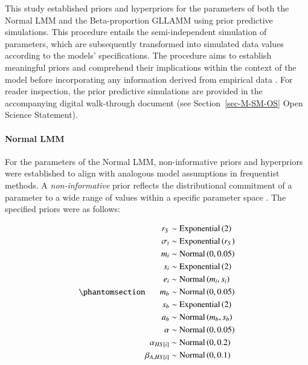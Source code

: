 \documentclass[
  authoryear,
  preprint,
  1p]{elsarticle}
\let\oldparagraph\paragraph
\renewcommand{\paragraph}[1]{\oldparagraph{#1}\mbox{}}
\begin{document}
This study established priors and hyperpriors for the parameters of both
the Normal LMM and the Beta-proportion GLLAMM using prior predictive
simulations. This procedure entails the semi-independent simulation of
parameters, which are subsequently transformed into simulated data
values according to the models' specifications. The procedure aims to
establish meaningful priors and comprehend their implications within the
context of the model before incorporating any information derived from
empirical data \citep{McElreath_2020}. For reader inspection, the prior
predictive simulations are provided in the accompanying digital
walk-through document (see Section~\ref{sec-M-SM-OS} Open Science
Statement).

\paragraph{Normal LMM}\label{sec-M-SM-P-NLMM}

For the parameters of the Normal LMM, non-informative priors and
hyperpriors were established to align with analogous model assumptions
in frequentist methods. A \emph{non-informative} prior reflects the
distributional commitment of a parameter to a wide range of values
within a specific parameter space \citep{Everitt_et_al_2010}. The
specified priors were as follows:

\begin{equation}\phantomsection\label{eq-normal-LMM-priors}{
\begin{aligned}
r_{S} &\sim \text{Exponential}\left( 2 \right) \\ 
\sigma_{i} &\sim \text{Exponential}\left( r_{S} \right) \\
m_{i} &\sim \text{Normal} \left( 0, 0.05 \right) \\
s_{i} &\sim \text{Exponential} \left( 2 \right) \\
e_{i} &\sim \text{Normal} \left( m_{i}, s_{i} \right) \\
m_{b} &\sim \text{Normal} \left( 0, 0.05 \right) \\
s_{b} &\sim \text{Exponential} \left( 2 \right) \\
a_{b} &\sim \text{Normal} \left( m_{b}, s_{b} \right) \\
\alpha &\sim \text{Normal} \left( 0, 0.05 \right) \\
\alpha_{HS[i]} &\sim \text{Normal} \left( 0, 0.2 \right) \\
\beta_{A,HS[i]} &\sim \text{Normal} \left( 0, 0.1 \right)
\end{aligned} 
}\end{equation}
\end{document}
